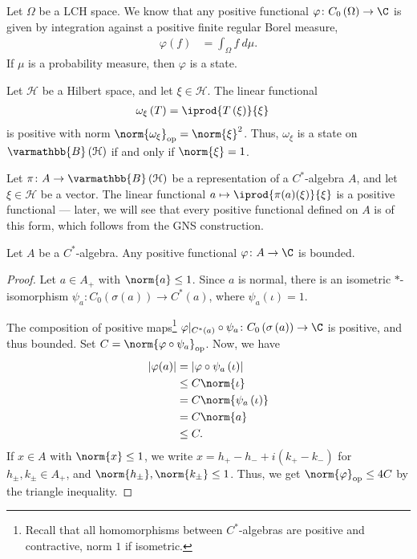 \documentclass[10pt]{mypackage}
\renewcommand*{\mathbb}[1]{\varmathbb{#1}}
\newcommand{\B}{\mathbb{B}}
\DeclareMathOperator{\op}{op}
\begin{document}
\begin{example}
  Let $\Omega$ be a LCH space. We know that any positive functional $\varphi\colon C_0\left(\Omega\right)\rightarrow \C$ is given by integration against a positive finite regular Borel measure,
  \begin{align*}
    \varphi\left(f\right) &= \int_{\Omega}^{} f\:d\mu.
  \end{align*}
  If $\mu$ is a probability measure, then $\varphi$ is a state.
\end{example}
\begin{example}
  Let $\mathcal{H}$ be a Hilbert space, and let $\xi\in \mathcal{H}$. The linear functional
  \begin{align*}
    \omega_{\xi}\left(T\right) &= \iprod{T\left(\xi\right)}{\xi}
  \end{align*}
  is positive with norm $\norm{\omega_{\xi}}_{\op} = \norm{\xi}^2$. Thus, $\omega_{\xi}$ is a state on $\B\left(\mathcal{H}\right)$ if and only if $\norm{\xi} = 1$.
\end{example}
\begin{example}
  Let $\pi\colon A\rightarrow \B\left(\mathcal{H}\right)$ be a representation of a $C^{\ast}$-algebra $A$, and let $\xi\in \mathcal{H}$ be a vector. The linear functional $a\mapsto \iprod{\pi(a)(\xi)}{\xi}$ is a positive functional --- later, we will see that every positive functional defined on $A$ is of this form, which follows from the GNS construction.
\end{example}
\begin{proposition}
  Let $A$ be a $C^{\ast}$-algebra. Any positive functional $\varphi\colon A\rightarrow \C$ is bounded.
\end{proposition}
\begin{proof}
  Let $a\in A_{+}$ with $\norm{a}\leq 1$. Since $a$ is normal, there is an isometric $\ast$-isomorphism $\psi_a\colon C_0\left(\sigma\left(a\right)\right)\rightarrow C^{\ast}\left(a\right)$, where $\psi_a\left(\iota\right) = 1$.\newline

  The composition of positive maps\footnote{Recall that all homomorphisms between $C^{\ast}$-algebras are positive and contractive, norm $1$ if isometric.} $\varphi|_{C^{\ast}\left(a\right)}\circ \psi_a\colon C_0\left(\sigma\left(a\right)\right)\rightarrow \C$ is positive, and thus bounded. Set $C = \norm{\varphi\circ \psi_a}_{\op}$. Now, we have
  \begin{align*}
    \left\vert \varphi(a) \right\vert &= \left\vert \varphi\circ \psi_a\left(\iota\right) \right\vert\\
                                      &\leq C\norm{\iota}\\
                                      &= C\norm{\psi_a\left(\iota\right)}\\
                                      &= C\norm{a}\\
                                      &\leq C.
  \end{align*}
  If $x\in A$ with $\norm{x}\leq 1$, we write $x = h_{+} - h_{-} + i\left(k_{+} - k_{-}\right)$ for $h_{\pm},k_{\pm}\in A_{+}$, and $\norm{h_{\pm}},\norm{k_{\pm}}\leq 1$. Thus, we get $\norm{\varphi}_{\op}\leq 4C$ by the triangle inequality.
\end{proof}
\end{document}
